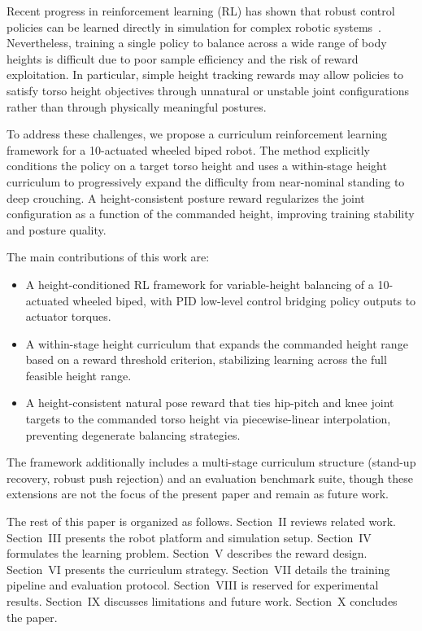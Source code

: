 \documentclass[conference]{IEEEtran}
\begin{document}
Recent progress in reinforcement learning (RL) has shown that robust control policies can be learned directly in simulation for complex robotic systems~\cite{ppo}. Nevertheless, training a single policy to balance across a wide range of body heights is difficult due to poor sample efficiency and the risk of reward exploitation. In particular, simple height tracking rewards may allow policies to satisfy torso height objectives through unnatural or unstable joint configurations rather than through physically meaningful postures.

To address these challenges, we propose a curriculum reinforcement learning framework for a 10-actuated wheeled biped robot. The method explicitly conditions the policy on a target torso height and uses a within-stage height curriculum to progressively expand the difficulty from near-nominal standing to deep crouching. A height-consistent posture reward regularizes the joint configuration as a function of the commanded height, improving training stability and posture quality.

The main contributions of this work are:
\begin{itemize}
    \item A height-conditioned RL framework for variable-height balancing of a 10-actuated wheeled biped, with PID low-level control bridging policy outputs to actuator torques.
    \item A within-stage height curriculum that expands the commanded height range based on a reward threshold criterion, stabilizing learning across the full feasible height range.
    \item A height-consistent natural pose reward that ties hip-pitch and knee joint targets to the commanded torso height via piecewise-linear interpolation, preventing degenerate balancing strategies.
\end{itemize}

The framework additionally includes a multi-stage curriculum structure (stand-up recovery, robust push rejection) and an evaluation benchmark suite, though these extensions are not the focus of the present paper and remain as future work.

The rest of this paper is organized as follows. Section~II reviews related work. Section~III presents the robot platform and simulation setup. Section~IV formulates the learning problem. Section~V describes the reward design. Section~VI presents the curriculum strategy. Section~VII details the training pipeline and evaluation protocol. Section~VIII is reserved for experimental results. Section~IX discusses limitations and future work. Section~X concludes the paper.
\end{document}
